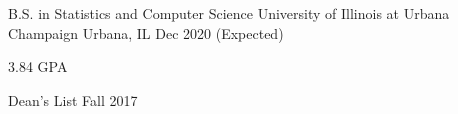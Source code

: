 \vspace*{-0.25cm}
\begin{cventries}
  \cventry
    {B.S. in Statistics and Computer Science}
    {University of Illinois at Urbana Champaign}
    {Urbana, IL}
    {Dec 2020 (Expected)}
    {
      \begin{cvitems}
        \item {3.84 GPA}
        \item {Dean's List Fall 2017}
      \end{cvitems}
    }
\end{cventries}
